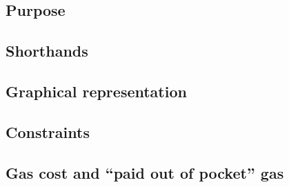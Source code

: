 \subsection{Purpose}                                                       \label{stp: create: intro}            
\subsection{Shorthands}                                                    \label{stp: create: shorthands}       
\subsection{Graphical representation}                                      \label{stp: create: representation}    
\subsection{Constraints}                                                   \label{stp: create: constraints}      
\subsection{Gas cost and ``paid out of pocket'' gas}                       \label{stp: create: setting}          
